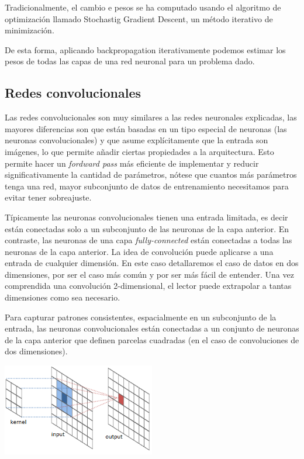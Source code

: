 \documentclass[12,twoside]{TFG-GM}
\theoremstyle{definition}
\theoremstyle{remark}
\begin{document}
Tradicionalmente, el cambio e pesos se ha computado usando el algoritmo de optimización llamado Stochastig Gradient Descent, un método iterativo de minimización.

De esta forma, aplicando backpropagation iterativamente podemos estimar los pesos de todas las capas de una red neuronal para un problema dado.




\newpage

\subsection{Redes convolucionales}

Las redes convolucionales son muy similares a las redes neuronales explicadas, las mayores diferencias son que están basadas en un tipo especial de neuronas (las neuronas convolucionales) y que asume explícitamente que la entrada son imágenes, lo que permite añadir ciertas propiedades a la arquitectura. Esto permite hacer un \textit{fordward pass} más eficiente de implementar y reducir significativamente la cantidad de parámetros, nótese que cuantos más parámetros tenga una red, mayor subconjunto de datos de entrenamiento necesitamos para evitar tener sobreajuste.

Típicamente las neuronas convolucionales tienen una entrada limitada, es decir están conectadas solo a un subconjunto de las neuronas de la capa anterior. En contraste, las neuronas de una capa \textit{fully-connected} están conectadas a todas las neuronas de la capa anterior. La idea de convolución puede aplicarse a una entrada de cualquier dimensión. En este caso detallaremos el caso de datos en dos dimensiones, por ser el caso más común y por ser más fácil de entender. Una vez comprendida una convolución 2-dimensional, el lector puede extrapolar a tantas dimensiones como sea necesario.

Para capturar patrones consistentes, espacialmente en un subconjunto de la entrada, las neuronas convolucionales están conectadas a un conjunto de neuronas de la capa anterior que definen parcelas cuadradas (en el caso de convoluciones de dos dimensiones).

\begin{center}
\includegraphics[width = 0.5\textwidth]{Images/convolution2.png} 
\end{center}
\end{document}
